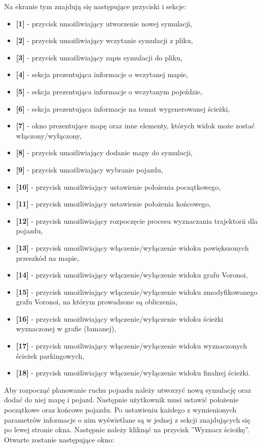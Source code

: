 \documentclass[a4paper,11pt,twoside]{report}
\theoremstyle{definition}
\begin{document}
Na ekranie tym znajdują się następujące przyciski i sekcje:
\begin{itemize}
	\item \textbf{[1]} - przycisk umożliwiający utworzenie nowej symulacji,
	\item \textbf{[2]} - przycisk umożliwiający wczytanie symulacji z pliku,
	\item \textbf{[3]} - przycisk umożliwiający zapis symulacji do pliku,
	\item \textbf{[4]} - sekcja prezentująca informacje o wczytanej mapie,
	\item \textbf{[5]} - sekcja prezentująca informacje o wczytanym pojeździe,
	\item \textbf{[6]} - sekcja prezentująca informacje na temat wygenerowanej ścieżki,
	\item \textbf{[7]} - okno prezentujące mapę oraz inne elementy, których widok może zostać włączony/wyłączony,
	\item \textbf{[8]} - przycisk umożliwiający dodanie mapy do symulacji,
	\item \textbf{[9]} - przycisk umożliwiający wybranie pojazdu,
	\item \textbf{[10]} - przycisk umożliwiający ustawienie położenia początkowego,
	\item \textbf{[11]} - przycisk umożliwiający ustawienie położenia końcowego,
	\item \textbf{[12]} - przycisk umożliwiający rozpoczęcie procesu wyznaczania trajektorii dla pojazdu,
	\item \textbf{[13]} - przycisk umożliwiający włączenie/wyłączenie widoku powiększonych przeszkód na mapie,
	\item \textbf{[14]} - przycisk umożliwiający włączenie/wyłączenie widoku grafu Voronoi,
	\item \textbf{[15]} - przycisk umożliwiający włączenie/wyłączenie widoku zmodyfikowanego grafu Voronoi, na którym prowadzone są obliczenia,
	\item \textbf{[16]} - przycisk umożliwiający włączenie/wyłączenie widoku ścieżki wyznaczonej w grafie (łamanej),
	\item \textbf{[17]} - przycisk umożliwiający włączenie/wyłączenie widoku wyznaczonych ścieżek parkingowych,
	\item \textbf{[18]} - przycisk umożliwiający włączenie/wyłączenie widoku finalnej ścieżki.
\end{itemize}

Aby rozpocząć planowanie ruchu pojazdu należy utworzyć nową symulację oraz dodać do niej mapę i pojazd. Następnie użytkownik musi ustawić położenie początkowe oraz końcowe pojazdu. Po ustawieniu każdego z wymienionych parametrów informacje o nim wyświetlane są w jednej z sekcji znajdujących się po lewej stronie okna. Następnie należy kliknąć na przycisk ''Wyznacz ścieżkę''. Otwarte zostanie następujące okno:
\end{document}
